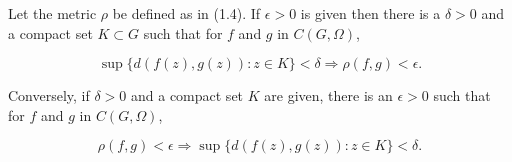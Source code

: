 Let the metric $\rho$ be defined as in (1.4). If $\epsilon > 0$ is given then there is a $\delta > 0$ and a compact set $K \subset G$ such that for $f$ and $g$ in $C(G, \Omega)$,

$$\sup \{d(f(z), g(z)): z \in K\} < \delta \Rightarrow \rho(f, g) < \epsilon.$$

Conversely, if $\delta > 0$ and a compact set $K$ are given, there is an $\epsilon > 0$ such that for $f$ and $g$ in $C(G, \Omega)$,

$$\rho(f, g) < \epsilon \Rightarrow \sup \{d(f(z), g(z)): z \in K\} < \delta.$$
